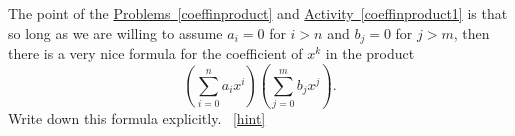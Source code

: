 \documentclass{book}
\begin{document}
\setcounter{project}{247}
\addtocounter{project}{-1}
\begin{activity}[]\label{coeffinproduct2}
\hypertarget{p-1342}{}%
The point of the \hyperref[coeffinproduct]{Problems~\ref{coeffinproduct}} and \hyperref[coeffinproduct1]{Activity~\ref{coeffinproduct1}} is that so long as we are willing to assume \(a_i=0\) for \(i>n\) and \(b_j =0\) for \(j>m\), then there is a very nice formula for the coefficient of \(x^k\) in the product%
\begin{equation*}
\left(\sum_{i=0}^n a_ix^i\right)\left(\sum_{j=0}^m b_jx^j\right).
\end{equation*}
Write down this formula explicitly.%
~\hfill{\tiny\hyperlink{a-247}{[hint]}\hypertarget{q-247}{}}\end{activity}
\end{document}
